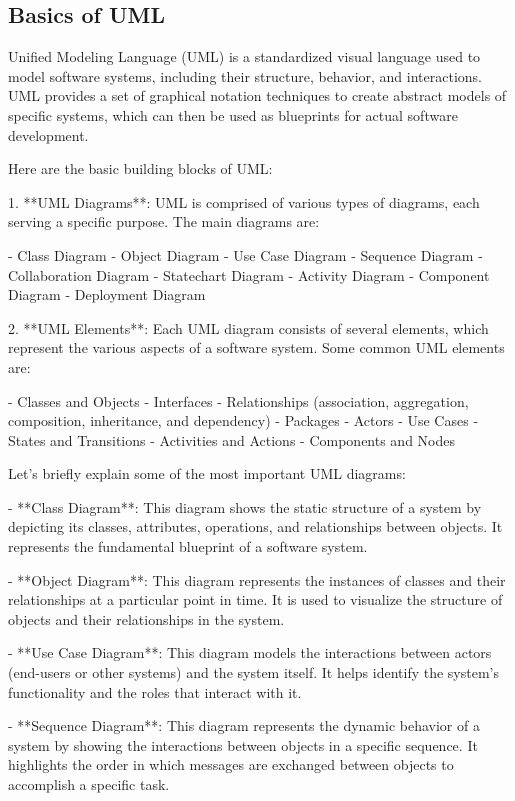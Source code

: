 \documentclass{article}
\begin{document}
\subsection{Basics of UML}

Unified Modeling Language (UML) is a standardized visual language used to model software systems, including their structure, behavior, and interactions. UML provides a set of graphical notation techniques to create abstract models of specific systems, which can then be used as blueprints for actual software development.

Here are the basic building blocks of UML:

1. **UML Diagrams**: UML is comprised of various types of diagrams, each serving a specific purpose. The main diagrams are:

   - Class Diagram
   - Object Diagram
   - Use Case Diagram
   - Sequence Diagram
   - Collaboration Diagram
   - Statechart Diagram
   - Activity Diagram
   - Component Diagram
   - Deployment Diagram

2. **UML Elements**: Each UML diagram consists of several elements, which represent the various aspects of a software system. Some common UML elements are:

   - Classes and Objects
   - Interfaces
   - Relationships (association, aggregation, composition, inheritance, and dependency)
   - Packages
   - Actors
   - Use Cases
   - States and Transitions
   - Activities and Actions
   - Components and Nodes

Let's briefly explain some of the most important UML diagrams:

- **Class Diagram**: This diagram shows the static structure of a system by depicting its classes, attributes, operations, and relationships between objects. It represents the fundamental blueprint of a software system.

- **Object Diagram**: This diagram represents the instances of classes and their relationships at a particular point in time. It is used to visualize the structure of objects and their relationships in the system.

- **Use Case Diagram**: This diagram models the interactions between actors (end-users or other systems) and the system itself. It helps identify the system's functionality and the roles that interact with it.

- **Sequence Diagram**: This diagram represents the dynamic behavior of a system by showing the interactions between objects in a specific sequence. It highlights the order in which messages are exchanged between objects to accomplish a specific task.
\end{document}

